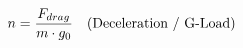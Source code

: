 \documentclass[preview]{standalone}
\begin{document}
\begin{align*}
\special{dvisvgm:raw <g id='unique000'>}n = \frac{F_{drag}}{m \cdot g_0} \quad \text{(Deceleration / G-Load)}\special{dvisvgm:raw </g>}
\end{align*}
\end{document}
